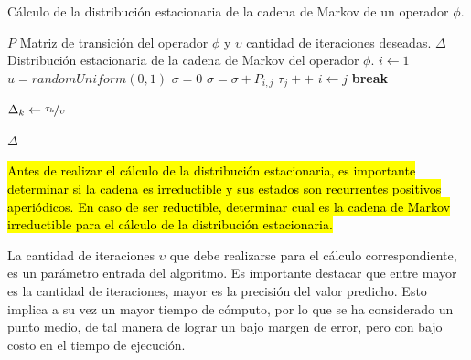 \begin{algorithm}[!t]
	\caption{Cálculo de la distribución estacionaria de la cadena de Markov de un operador $\phi$.}
	\label{alg:distEstacionaria}
	\begin{algorithmic}[1]
	\REQUIRE $P$ Matriz de transición del operador $\phi$ y $\upsilon$ cantidad de iteraciones deseadas.
	\ENSURE $\Delta$ Distribución estacionaria de la cadena de Markov del operador $\phi$.
	\STATE $i \leftarrow 1$
		\STATE $u = randomUniform(0,1)$
		\STATE $\sigma = 0$
			\STATE $\sigma = \sigma + P_{i,j}$
				\STATE $\tau_{j}++$
				\STATE $i \leftarrow j$
				\STATE \textbf{break}
			\ENDIF
		\ENDFOR
	\ENDFOR

		\STATE $\Delta_{k} \leftarrow \nicefrac{\tau_{k}}{\upsilon}$
	\ENDFOR	
	
	\RETURN $\Delta$
	
	\end{algorithmic}
\end{algorithm}


\hl{Antes de realizar el cálculo de la distribución estacionaria, es importante determinar si la cadena es irreductible y sus estados son recurrentes positivos aperiódicos. En caso de ser reductible, determinar cual es la cadena de Markov irreductible para el cálculo de la distribución estacionaria.}

La cantidad de iteraciones $\upsilon$ que debe realizarse para el cálculo correspondiente, es un parámetro entrada del algoritmo. Es importante destacar que entre mayor es la cantidad de iteraciones, mayor es la precisión del valor predicho. Esto implica a su vez un mayor tiempo de cómputo, por lo que se ha considerado un punto medio, de tal manera de lograr un bajo margen de error, pero con bajo costo en el tiempo de ejecución. %

